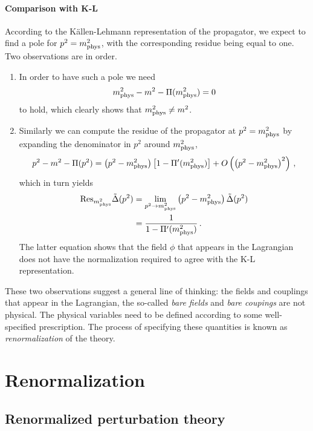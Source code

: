 \paragraph{Comparison with K-L}

According to the K\"allen-Lehmann representation of the propagator, we
expect to find a pole for $p^2=m_\mathrm{phys}^2$, with the corresponding
residue being equal to one. Two observations are in order.
\begin{enumerate}
\item 
  In order to have such a pole we need
  \begin{equation}
    \label{eq:MphysPole}
    m_\mathrm{phys}^2 - m^2 - \Pi(m_\mathrm{phys}^2) = 0
  \end{equation}
  to hold, which clearly shows that $m_\mathrm{phys}^2\neq m^2$.
\item
  Similarly we can
  compute the residue of the propagator at $p^2=m_\mathrm{phys}^2$ by expanding
  the denominator in $p^2$ around $m_\mathrm{phys}^2$,
  \begin{equation}
    \label{eq:ResDenExp}
    p^2-m^2-\Pi(p^2) =
    \left(p^2 - m_\mathrm{phys}^2\right) \left[1 - \Pi'(m_\mathrm{phys}^2)\right] +
    O\left(\left(p^2 - m_\mathrm{phys}^2\right)^2\right)\, ,
  \end{equation}
  which in turn yields
  \begin{align}
    \mathrm{Res}_{m_\mathrm{phys}^2} \tilde{\Delta}(p^2)
    &= \lim_{p^2\to m_\mathrm{phys}^2} \left(p^2 - m_\mathrm{phys}^2\right) \tilde{\Delta}(p^2) \\
    &= \frac{1}{1 - \Pi'(m_\mathrm{phys}^2)}\, .
  \end{align}
  The latter equation shows that the field $\phi$ that appears in the
  Lagrangian does not have the normalization required to agree with the
  K-L representation.
\end{enumerate}
These two observations suggest a general line of thinking: the fields
and couplings that appear in the Lagrangian, the so-called {\em bare
  fields} and {\em bare coupings} are not physical. The physical
variables need to be defined according to some well-specified
prescription. The process of specifying these quantities is known as
{\em renormalization} of the theory.

\section{Renormalization}
\label{sec:renormalization}

\subsection{Renormalized perturbation theory}
\label{sec:renorm-pert-theory}

